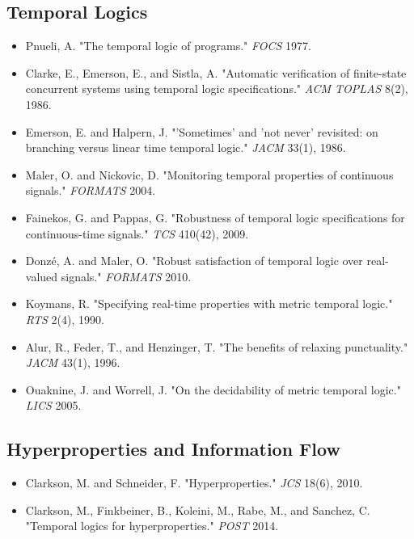 \documentclass[11pt]{article}
\begin{document}
\subsection{Temporal Logics}
\label{sec:org037c2d6}
\begin{itemize}
\item Pnueli, A. "The temporal logic of programs." \emph{FOCS} 1977.
\item Clarke, E., Emerson, E., and Sistla, A. "Automatic verification of finite-state concurrent systems using temporal logic specifications." \emph{ACM TOPLAS} 8(2), 1986.
\item Emerson, E. and Halpern, J. "'Sometimes' and 'not never' revisited: on branching versus linear time temporal logic." \emph{JACM} 33(1), 1986.
\item Maler, O. and Nickovic, D. "Monitoring temporal properties of continuous signals." \emph{FORMATS} 2004.
\item Fainekos, G. and Pappas, G. "Robustness of temporal logic specifications for continuous-time signals." \emph{TCS} 410(42), 2009.
\item Donzé, A. and Maler, O. "Robust satisfaction of temporal logic over real-valued signals." \emph{FORMATS} 2010.
\item Koymans, R. "Specifying real-time properties with metric temporal logic." \emph{RTS} 2(4), 1990.
\item Alur, R., Feder, T., and Henzinger, T. "The benefits of relaxing punctuality." \emph{JACM} 43(1), 1996.
\item Ouaknine, J. and Worrell, J. "On the decidability of metric temporal logic." \emph{LICS} 2005.
\end{itemize}
\subsection{Hyperproperties and Information Flow}
\label{sec:orgb643c73}
\begin{itemize}
\item Clarkson, M. and Schneider, F. "Hyperproperties." \emph{JCS} 18(6), 2010.
\item Clarkson, M., Finkbeiner, B., Koleini, M., Rabe, M., and Sanchez, C. "Temporal logics for hyperproperties." \emph{POST} 2014.
\end{itemize}
\end{document}
